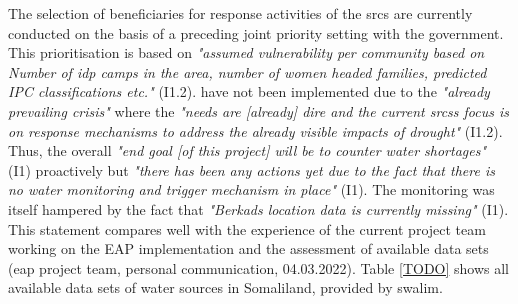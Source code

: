 The selection of beneficiaries for response activities of the \acrshort*{srcs} are currently conducted on the basis of a preceding joint priority setting with the government. This prioritisation is based on \textit{"assumed vulnerability per community based on Number of \acrfull{idp} camps in the area, number of women headed families, predicted IPC classifications etc."} (I1.2).  have not been implemented due to the \textit{"already prevailing crisis"} where the \textit{"needs are [already] dire and the current \acrshort*{srcs}s focus is on response mechanisms to address the already visible impacts of drought"} (I1.2). Thus, the overall \textit{"end goal [of this project] will be to counter water shortages"} (I1) proactively but \textit{"there has been any actions yet due to the fact that there is no water monitoring and trigger mechanism in place"} (I1). The monitoring was itself hampered by the fact that \textit{"Berkads location data is currently missing"} (I1). This statement compares well with the experience of the current project team working on the EAP implementation and the assessment of available data sets (\acrshort{eap} project team, personal communication, 04.03.2022).\newline
Table \ref*{TODO} shows all available data sets of water sources in Somaliland, provided by \acrshort*{swalim}. %


